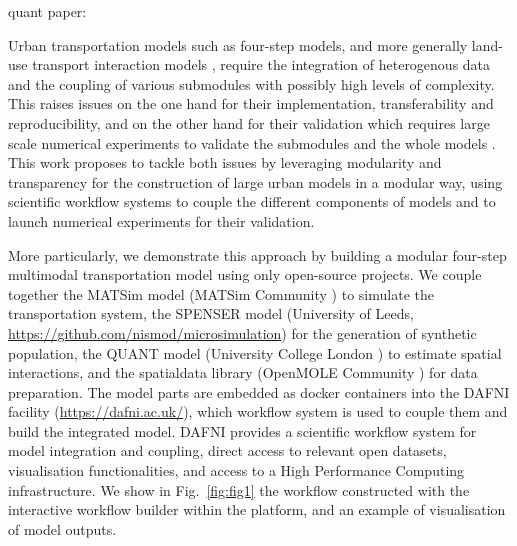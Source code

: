 \documentclass[3p,times,procedia]{elsarticle}
\begin{document}
\cite{chen2021effects}

quant paper: \cite{batty2021new}

\cite{usher2019software}

\cite{horl2021integrating}

\cite{horl2020reproducible}



Urban transportation models such as four-step models, and more generally land-use transport interaction models \citep{wegener2004land}, require the integration of heterogenous data and the coupling of various submodules with possibly high levels of complexity. This raises issues on the one hand for their implementation, transferability and reproducibility, and on the other hand for their validation which requires large scale numerical experiments to validate the submodules and the whole models \citep{lee1973requiem,batty2014can}. This work proposes to tackle both issues by leveraging modularity and transparency for the construction of large urban models in a modular way, using scientific workflow systems \citep{barker2007scientific} to couple the different components of models and to launch numerical experiments for their validation.

More particularly, we demonstrate this approach by building a modular four-step multimodal transportation model using only open-source projects. We couple together the MATSim model (MATSim Community \citep{horni2016multi}) to simulate the transportation system, the SPENSER model (University of Leeds, \url{https://github.com/nismod/microsimulation}) for the generation of synthetic population, the QUANT model (University College London \citep{milton2019accelerating}) to estimate spatial interactions, and the spatialdata library (OpenMOLE Community \citep{raimbault2020scala}) for data preparation. The model parts are embedded as docker containers into the DAFNI facility (\url{https://dafni.ac.uk/}), which workflow system is used to couple them and build the integrated model. DAFNI provides a scientific workflow system for model integration and coupling, direct access to relevant open datasets, visualisation functionalities, and access to a High Performance Computing infrastructure. We show in Fig.~\ref{fig:fig1} the workflow constructed with the interactive workflow builder within the platform, and an example of visualisation of model outputs.
\end{document}
